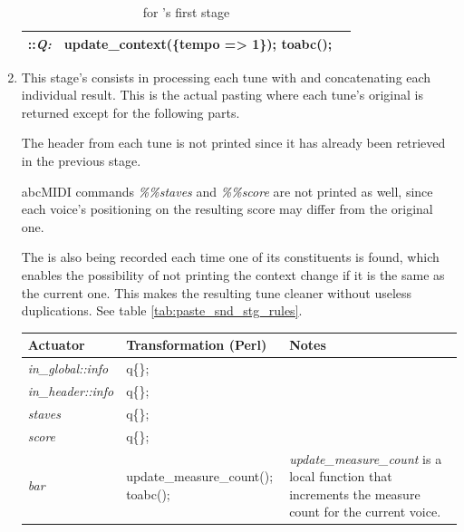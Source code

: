\begin{enumerate}
\begin{center}
\begin{table}[h]
\begin{tabular}{|p{2.25cm}|p{7.25cm}|p{5cm}|}
      \hline
      \inheader{}::\emph{Q:} & update\_context(\{tempo => 1\}); toabc(); &
      \\
      \hline
    \end{tabular}
    \caption{\abcdtrules{} for \pasteabc{}'s first stage}
    \label{tab:paste_fst_stg_rules}
  \end{table}
\end{center}

\item This stage's consists in processing each tune with \dt{} and concatenating each individual
result. This is the actual pasting where each tune's original \abc{} is returned except for the
following parts.

The header from each tune is not printed since it has already been retrieved in the previous stage.

abcMIDI commands \emph{\%\%staves} and \emph{\%\%score} are not printed as well, since each voice's
positioning on the resulting score may differ from the original one.

The \context{} is also being recorded each time one of its constituents is found, which enables the
possibility of not printing the context change if it is the same as the current one. This makes the
resulting tune cleaner without useless duplications. See table \ref{tab:paste_snd_stg_rules}.

\begin{center}
  \begin{table}[h]
    \begin{tabular}{|p{2.5cm}|p{4.75cm}|p{8cm}|}
      \hline
      Actuator & Transformation (Perl) & Notes\\
      \hline
      \hline
      \emph{in\_global::info} & q\{\}; &
      \\
      \hline

      \hline
      \emph{in\_header::info} & q\{\}; &
      \\
      \hline

      \hline
      \emph{staves} & q\{\}; &
      \\
      \hline

      \hline
      \emph{score} & q\{\}; &
      \\
      \hline

      \hline
      \emph{bar} & update\_measure\_count(); toabc(); & \emph{update\_measure\_count} is a local
      function that increments the measure count for the current voice.
      \\
      \hline


\end{tabular}
\end{table}
\end{center}
\end{enumerate}
